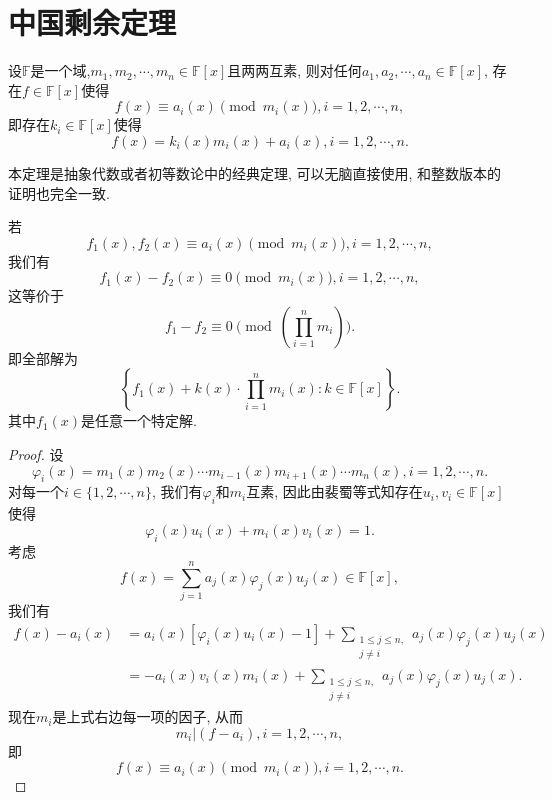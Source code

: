 \documentclass[../../main.tex]{subfiles}%
\begin{document}
\section{中国剩余定理}

\begin{theorem}[中国剩余定理]\label{theorem:中国剩余定理(多项式版)}
设$\mathbb{F}$是一个域,$m_1,m_2,\cdots,m_n\in\mathbb{F}[x]$且两两互素, 则对任何$a_1,a_2,\cdots,a_n\in\mathbb{F}[x]$, 存在$f\in\mathbb{F}[x]$使得
$$
f(x)\equiv a_i(x)\pmod{m_i(x)},i=1,2,\cdots,n,
$$
即存在$k_i\in\mathbb{F}[x]$使得
$$
f(x)=k_i(x)m_i(x)+a_i(x),i=1,2,\cdots,n.
$$
\end{theorem}
\begin{note}
本定理是抽象代数或者初等数论中的经典定理, 可以无脑直接使用, 和整数版本的证明也完全一致.
\end{note}
\begin{remark}
若
$$
f_1(x),f_2(x)\equiv a_i(x)\pmod{m_i(x)},i=1,2,\cdots,n,
$$
我们有
$$
f_1(x)-f_2(x)\equiv0\pmod{m_i(x)},i=1,2,\cdots,n,
$$
这等价于
$$
f_1-f_2\equiv0\pmod{\left(\prod_{i=1}^{n}m_i\right)}.
$$
即全部解为
$$
\left\{f_1(x)+k(x)\cdot\prod_{i=1}^{n}m_i(x):k\in\mathbb{F}[x]\right\}.
$$
其中$f_1(x)$是任意一个特定解.
\end{remark}
\begin{proof}

设
$$
\varphi_i(x)=m_1(x)m_2(x)\cdots m_{i-1}(x)m_{i+1}(x)\cdots m_n(x),i=1,2,\cdots,n.
$$
对每一个$i\in\{1,2,\cdots,n\}$, 我们有$\varphi_i$和$m_i$互素, 因此由裴蜀等式知存在$u_i,v_i\in\mathbb{F}[x]$使得
$$
\varphi_i(x)u_i(x)+m_i(x)v_i(x)=1.
$$
考虑
$$
f(x)=\sum_{j=1}^{n}a_j(x)\varphi_j(x)u_j(x)\in\mathbb{F}[x],
$$
我们有
$$
\begin{aligned}
f(x)-a_i(x)&=a_i(x)\left[\varphi_i(x)u_i(x)-1\right]+\sum_{\substack{1\leqslant j\leqslant n,\\j\neq i}}a_j(x)\varphi_j(x)u_j(x)\\
&=-a_i(x)v_i(x)m_i(x)+\sum_{\substack{1\leqslant j\leqslant n,\\j\neq i}}a_j(x)\varphi_j(x)u_j(x).
\end{aligned}
$$
现在$m_i$是上式右边每一项的因子, 从而
$$
m_i|(f-a_i),i=1,2,\cdots,n,
$$
即
$$
f(x)\equiv a_i(x)\pmod{m_i(x)},i=1,2,\cdots,n.
$$

\end{proof}
\end{document}
